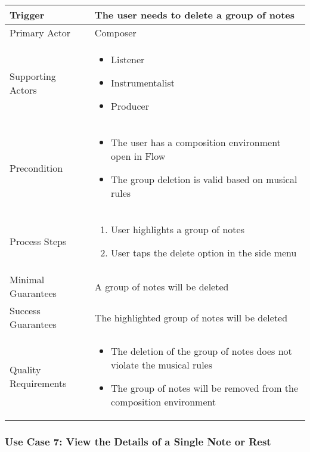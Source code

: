 \begin{tabularx}{\textwidth}{|X|X|}
\hline
Trigger & 
The user needs to delete a group of notes \\
\hline
Primary Actor & 
Composer \\
\hline
Supporting Actors & 
\begin{itemize}
\item Listener
\item Instrumentalist
\item Producer
\end{itemize} \\
\hline
Precondition & 
\begin{itemize}
\item The user has a composition environment open in Flow
\item The group deletion is valid based on musical rules
\end{itemize} \\
\hline
Process Steps & 
\begin{enumerate}
\item User highlights a group of notes
\item User taps the delete option in the side menu
\end{enumerate} \\
\hline
Minimal Guarantees & 
A group of notes will be deleted \\
\hline
Success Guarantees & 
The highlighted group of notes will be deleted \\
\hline
Quality Requirements & 
\begin{itemize}
\item The deletion of the group of notes does not violate the musical rules
\item The group of notes will be removed from the composition environment
\end{itemize} \\ 
\hline
\end{tabularx}

\subsubsection{Use Case 7: View the Details of a Single Note or Rest}

